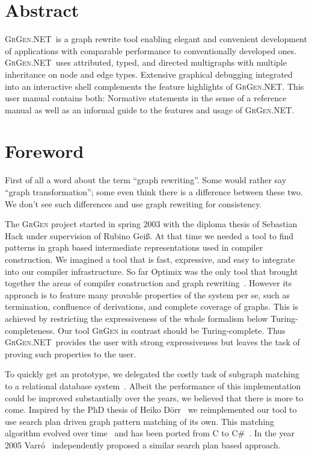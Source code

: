 \documentclass[a4paper,final,11pt]{book}
\providecommand{\GrG}{{\scshape GrGen.NET}}
\begin{document}
\chapter*{Abstract}
\GrG\ is a graph rewrite tool enabling elegant and convenient development of applications with comparable performance to conventionally developed ones.
\GrG\ uses attributed, typed, and directed multigraphs with multiple inheritance on node and edge types.
Extensive graphical debugging integrated into an interactive shell complements the feature highlights of \GrG.
This user manual contains both: Normative statements in the sense of a reference manual as well as an informal guide to the features and usage of \GrG.

\chapter*{Foreword}
First of all a word about the term ``graph rewriting''.
Some would rather say ``graph transformation''; some even think there is a difference between these two.
We don't see such differences and use graph rewriting for consistency.

The \textsc{GrGen} project started in spring 2003 with the diploma thesis of Sebastian Hack under supervision of Rubino Gei\ss.
At that time we needed a tool to find patterns in graph based intermediate representations used in compiler construction.
We imagined a tool that is fast, expressive, and easy to integrate into our compiler infrastructure.
So far Optimix was the only tool that brought together the areas of compiler construction and graph rewriting~\cite{assmann00graph}.
However its approach is to feature many provable properties of the system per se, such as termination, confluence of derivations, and complete coverage of graphs.
This is achieved by restricting the expressiveness of the whole formalism below Turing-completeness.
Our tool \textsc{GrGen} in contrast should be Turing-complete.
Thus \GrG\ provides the user with strong expressiveness but leaves the task of proving such properties to the user.

To quickly get an prototype, we delegated the costly task of subgraph matching to a relational database system~\cite{Hac:03}.
Albeit the performance of this implementation could be improved substantially over the years, we believed that there is more to come.
Inspired by the PhD thesis of Heiko D\"orr~\cite{doerr} we reimplemented our tool to use search plan driven graph pattern matching of its own.
This matching algorithm evolved over time~\cite{adam,Bat:05:SA,Bat:05:DA,Bat:06,BKG:07} and has been ported from C to C\#~\cite{KG:07,Kro:07}. 
In the year 2005 Varr\'o~\cite{gramot2005_adapt} independently proposed a similar search plan based approach.
\end{document}
